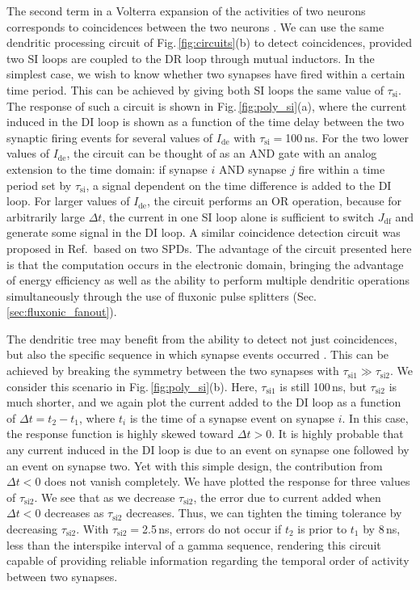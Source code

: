 \documentclass[twocolumn]{article}
\newcommand{\onlinecite}[1]{\hspace{-1 ex} \nocite{#1}\citenum{#1}}
\begin{document}
The second term in a Volterra expansion of the activities of two neurons corresponds to coincidences between the two neurons \cite{geki2002}. We can use the same dendritic processing circuit of Fig.\,\ref{fig:circuits}(b) to detect coincidences, provided two SI loops are coupled to the DR loop through mutual inductors. In the simplest case, we wish to know whether two synapses have fired within a certain time period. This can be achieved by giving both SI loops the same value of $\tau_{\mathrm{si}}$. The response of such a circuit is shown in Fig.\,\ref{fig:poly_si}(a), where the current induced in the DI loop is shown as a function of the time delay between the two synaptic firing events for several values of $I_{\mathrm{de}}$ with $\tau_{\mathrm{si}} =$100\,ns. For the two lower values of $I_{\mathrm{de}}$, the circuit can be thought of as an AND gate with an analog extension to the time domain: if synapse $i$ AND synapse $j$ fire within a time period set by $\tau_{\mathrm{si}}$, a signal dependent on the time difference is added to the DI loop. For larger values of $I_{\mathrm{de}}$, the circuit performs an OR operation, because for arbitrarily large $\Delta t$, the current in one SI loop alone is sufficient to switch $J_{\mathrm{df}}$ and generate some signal in the DI loop. A similar coincidence detection circuit was proposed in Ref.\,\onlinecite{sh2018_full} based on two SPDs. The advantage of the circuit presented here is that the computation occurs in the electronic domain, bringing the advantage of energy efficiency as well as the ability to perform multiple dendritic operations simultaneously through the use of fluxonic pulse splitters (Sec.\,\ref{sec:fluxonic_fanout}).

The dendritic tree may benefit from the ability to detect not just coincidences, but also the specific sequence in which synapse events occurred \cite{haah2015}. This can be achieved by breaking the symmetry between the two synapses with $\tau_{\mathrm{si1}} \gg \tau_{\mathrm{si2}}$. We consider this scenario in Fig.\,\ref{fig:poly_si}(b). Here, $\tau_{\mathrm{si1}}$ is still 100\,ns, but $\tau_{\mathrm{si2}}$ is much shorter, and we again plot the current added to the DI loop as a function of $\Delta t = t_2-t_1$, where $t_i$ is the time of a synapse event on synapse $i$. In this case, the response function is highly skewed toward $\Delta t > 0$. It is highly probable that any current induced in the DI loop is due to an event on synapse one followed by an event on synapse two. Yet with this simple design, the contribution from $\Delta t < 0$ does not vanish completely. We have plotted the response for three values of $\tau_{\mathrm{si2}}$. We see that as we decrease $\tau_{\mathrm{si2}}$, the error due to current added when $\Delta t < 0$ decreases as $\tau_{\mathrm{si2}}$ decreases. Thus, we can tighten the timing tolerance by decreasing $\tau_{\mathrm{si2}}$. With $\tau_{\mathrm{si2}} = $2.5\,ns, errors do not occur if $t_2$ is prior to $t_1$ by 8\,ns, less than the interspike interval of a gamma sequence, rendering this circuit capable of providing reliable information regarding the temporal order of activity between two synapses.
\end{document}

